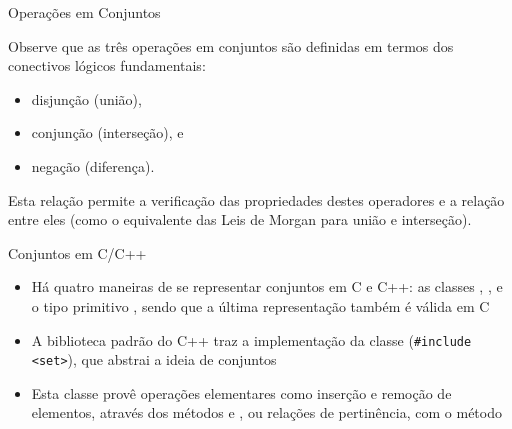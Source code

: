 \begin{frame}[fragile]{Operações em Conjuntos}

Observe que as três operações em conjuntos são definidas em termos dos conectivos lógicos fundamentais: 

    \begin{itemize}
        \item disjunção (união),
        \item conjunção (interseção), e
        \item negação (diferença).
    \end{itemize}

\vspace{0.2in}

Esta relação permite a verificação das propriedades destes operadores e a relação entre eles (como o equivalente das Leis de Morgan para união e interseção).

\end{frame}

\begin{frame}[fragile]{Conjuntos em C/C++}

    \begin{itemize}
        \item Há quatro maneiras de se representar conjuntos em C e C++: as classes , ,  e o tipo primitivo 
            , sendo que a última representação também é válida em C

        \item A biblioteca padrão do C++ traz a implementação da classe  (\texttt{#include <set>}), que abstrai a ideia de conjuntos

        \item Esta classe provê operações elementares como inserção e remoção de elementos, através dos métodos  e , ou
            relações de pertinência, com o método 
    \end{itemize}

\end{frame}

